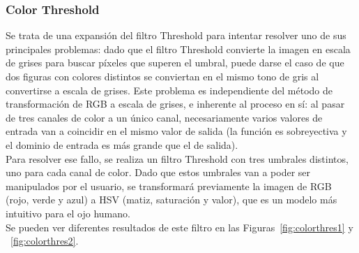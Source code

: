 {	\subsubsection{Color Threshold}

	Se trata de una expansión del filtro Threshold para intentar resolver uno de sus principales problemas: dado que el filtro Threshold convierte la imagen en escala de grises para buscar píxeles que superen el umbral, puede darse el caso de que dos figuras con colores distintos se conviertan en el mismo tono de gris al convertirse a escala de grises. Este problema es independiente del método de transformación de RGB a escala de grises, e inherente al proceso en sí: al pasar de tres canales de color a un único canal, necesariamente varios valores de entrada van a coincidir en el mismo valor de salida (la función es sobreyectiva y el dominio de entrada es más grande que el de salida).\\
	
	Para resolver ese fallo, se realiza un filtro Threshold con tres umbrales distintos, uno para cada canal de color. Dado que estos umbrales van a poder ser manipulados por el usuario, se transformará previamente la imagen de RGB (rojo, verde y azul) a HSV (matiz, saturación y valor), que es un modelo más intuitivo para el ojo humano.\\
	
	Se pueden ver diferentes resultados de este filtro en las Figuras~\ref{fig:colorthres1} y ~\ref{fig:colorthres2}.
	
}
